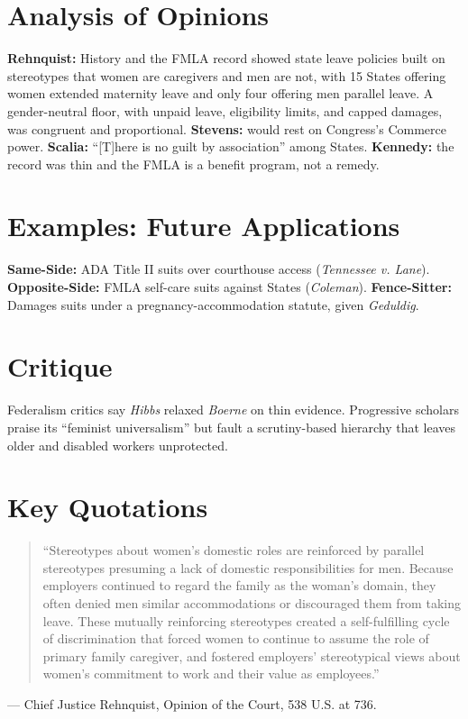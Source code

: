 \documentclass[12pt]{article}
\begin{document}
\section{Analysis of Opinions}
\textbf{Rehnquist:} History and the FMLA record showed state leave policies built on stereotypes that women are caregivers and men are not, with 15 States offering women extended maternity leave and only four offering men parallel leave. A gender-neutral floor, with unpaid leave, eligibility limits, and capped damages, was congruent and proportional. \textbf{Stevens:} would rest on Congress's Commerce power. \textbf{Scalia:} ``[T]here is no guilt by association'' among States. \textbf{Kennedy:} the record was thin and the FMLA is a benefit program, not a remedy.

\section{Examples: Future Applications}
\textbf{Same-Side:} ADA Title II suits over courthouse access (\textit{Tennessee v. Lane}). \textbf{Opposite-Side:} FMLA self-care suits against States (\textit{Coleman}). \textbf{Fence-Sitter:} Damages suits under a pregnancy-accommodation statute, given \textit{Geduldig}.

\section{Critique}
Federalism critics say \textit{Hibbs} relaxed \textit{Boerne} on thin evidence. Progressive scholars praise its ``feminist universalism'' but fault a scrutiny-based hierarchy that leaves older and disabled workers unprotected.

\section{Key Quotations}
\begin{quote}
``Stereotypes about women's domestic roles are reinforced by parallel stereotypes presuming a lack of domestic responsibilities for men. Because employers continued to regard the family as the woman's domain, they often denied men similar accommodations or discouraged them from taking leave. These mutually reinforcing stereotypes created a self-fulfilling cycle of discrimination that forced women to continue to assume the role of primary family caregiver, and fostered employers' stereotypical views about women's commitment to work and their value as employees.''
\end{quote}
\noindent --- Chief Justice Rehnquist, Opinion of the Court, 538 U.S. at 736.
\end{document}
